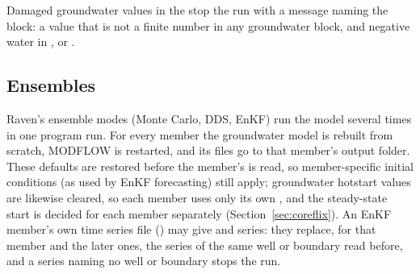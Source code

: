 Damaged groundwater values in the  stop the run with a message naming the block: a value that is not a finite
number in any groundwater block, and negative water in ,  or
.

\subsection{Ensembles}
Raven's ensemble modes (Monte Carlo, DDS, EnKF) run the model several times in one program run. For every member the
groundwater model is rebuilt from scratch, MODFLOW is restarted, and its files go to that member's output folder.
These defaults are
restored before the member's  is read, so member-specific initial conditions (as used by EnKF forecasting) still
apply; groundwater hotstart values are likewise cleared, so each member uses only its own , and the steady-state
start is decided for each member separately
(Section~\ref{sec:coreflix}). An EnKF member's own time series file () may give
 and  series: they replace, for that member and the later ones, the series of the
same well or boundary read before, and a series naming no well or boundary stops the run.

